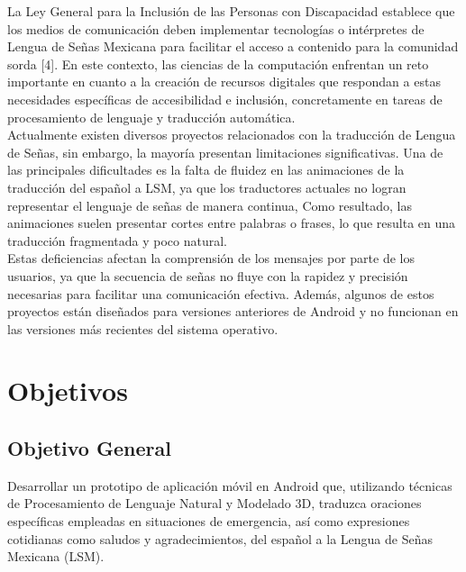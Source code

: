 La Ley General para la Inclusión de las Personas con Discapacidad establece que los medios de comunicación deben implementar tecnologías o intérpretes de Lengua de Señas Mexicana para facilitar el acceso a contenido para la comunidad sorda [4]. En este contexto, las ciencias de la computación enfrentan un reto importante en cuanto a la creación de recursos digitales que respondan a estas necesidades específicas de accesibilidad e inclusión, concretamente en tareas de procesamiento de lenguaje y traducción automática.\\

Actualmente existen diversos proyectos relacionados con la traducción de Lengua de Señas, sin embargo, la mayoría presentan limitaciones significativas. Una de las principales dificultades es la falta de fluidez en las animaciones de la traducción del español a LSM, ya que los traductores actuales no logran representar el lenguaje de señas de manera continua, Como resultado, las animaciones suelen presentar cortes entre palabras o frases, lo que resulta en una traducción fragmentada y poco natural.\\

Estas deficiencias afectan la comprensión de los mensajes por parte de los usuarios, ya que la secuencia de señas no fluye con la rapidez y precisión necesarias para facilitar una comunicación efectiva. Además, algunos de estos proyectos están diseñados para versiones anteriores de Android y no funcionan en las versiones más recientes del sistema operativo.\\


\section{Objetivos}
\subsection{Objetivo General}
Desarrollar un prototipo de aplicación móvil en Android que, utilizando técnicas de Procesamiento de Lenguaje Natural y Modelado 3D, traduzca oraciones específicas empleadas en situaciones de emergencia, así como expresiones cotidianas como saludos y agradecimientos, del español a la Lengua de Señas Mexicana (LSM).

